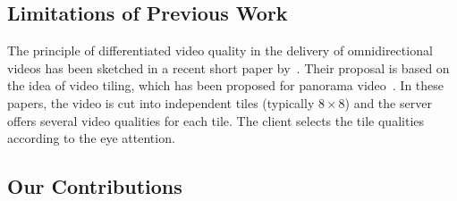 \subsection{Limitations of Previous Work}

The principle of differentiated video quality in the delivery of omnidirectional videos has been sketched 
in a recent short paper by~\citet{ochi_live_2015}. Their proposal is based on the idea of video
tiling, which has been proposed for panorama 
video~\cite{sanchez_compressed_2015,wang_mixing_2014,gaddam_tiling_2015}.
In these papers, the video is cut into independent tiles (typically $8\times 8$) and the server offers several
video qualities for each tile. The client selects the tile qualities according to the eye attention.

\subsection{Our Contributions}


